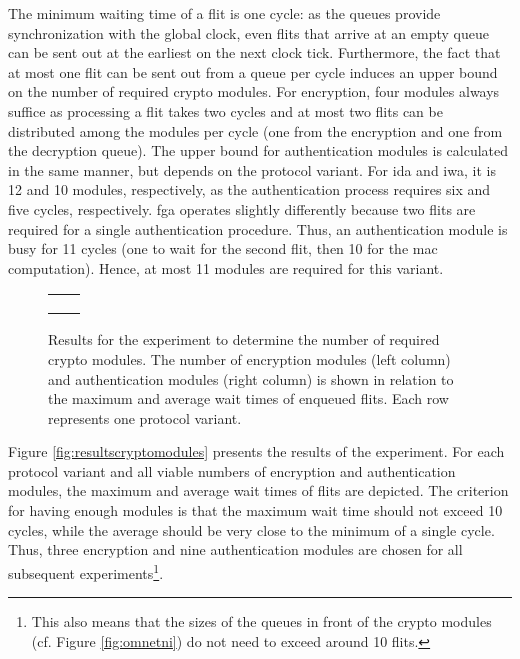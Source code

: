 The minimum waiting time of a flit is one cycle: as the queues provide synchronization with the global clock, even flits that arrive at an empty queue
can be sent out at the earliest on the next clock tick. Furthermore, the fact that at most one flit can be sent out from a queue per cycle induces an
upper bound on the number of required crypto modules. For encryption, four modules always suffice as processing a flit takes two cycles and at most two
flits can be distributed among the modules per cycle (one from the encryption and one from the decryption queue). The upper bound for authentication
modules is calculated in the same manner, but depends on the protocol variant. For \gls{ida} and \gls{iwa}, it is 12 and 10 modules, respectively, as
the authentication process requires six and five cycles, respectively. \Gls{fga} operates slightly differently because two flits are required for a
single authentication procedure. Thus, an authentication module is busy for 11 cycles (one to wait for the second flit, then 10 for the \gls{mac}
computation). Hence, at most 11 modules are required for this variant.

\begin{figure}
    \centering
    \begin{tabular}{ll}
         &  \\
         &  \\
         & 
    \end{tabular}
    \caption[Results for number of crypto modules experiment]{Results for the experiment to determine the number of required crypto modules. The
    number of encryption modules (left column) and authentication modules (right column) is shown in relation to the maximum and average wait times of
    enqueued flits. Each row represents one protocol variant.}
    \label{fig:resultscryptomodules}
\end{figure}

Figure \vref{fig:resultscryptomodules} presents the results of the experiment. For each protocol variant and all viable numbers of encryption and
authentication modules, the maximum and average wait times of flits are depicted. The criterion for having enough modules is that the maximum wait
time should not exceed 10 cycles, while the average should be very close to the minimum of a single cycle. Thus, three encryption and nine
authentication modules are chosen for all subsequent experiments\footnote{This also means that the sizes of the queues in front of the crypto modules
(cf. Figure \ref{fig:omnetni}) do not need to exceed around 10 flits.}.

